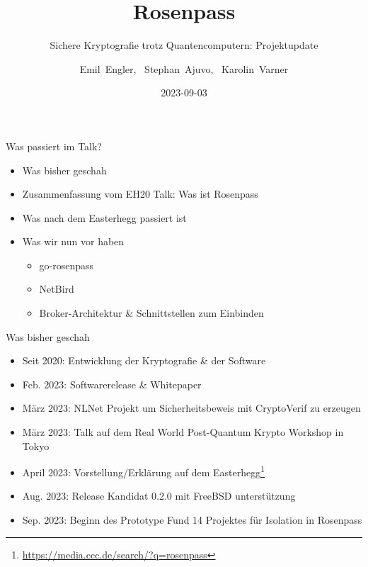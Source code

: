 \documentclass[german]{rosenpass-beamer}
\date{2023-09-03}
\title{Rosenpass}
\subtitle{
  Sichere Kryptografie trotz Quantencomputern: Projektupdate
}
\author{Emil~Engler, \ Stephan~Ajuvo, \ Karolin~Varner}
\begin{document}
\maketitle

		
\begin{frame}{Was passiert im Talk?}
\begin{itemize}
  \item Was bisher geschah
  \item Zusammenfassung vom EH20 Talk: Was ist Rosenpass
  \item Was nach dem Easterhegg passiert ist
  \item Was wir nun vor haben
    \begin{itemize}
      \item go-rosenpass
      \item NetBird
      \item Broker-Architektur \& Schnittstellen zum Einbinden
    \end{itemize}
\end{itemize}
\end{frame}

\begin{frame}{Was bisher geschah}
  \begin{itemize}
    \item Seit 2020: Entwicklung der Kryptografie \& der Software
    \item Feb. 2023: Softwarerelease \& Whitepaper
    \item März 2023: NLNet Projekt um Sicherheitsbeweis mit CryptoVerif zu erzeugen
    \item März 2023: Talk auf dem Real World Post-Quantum Krypto Workshop in Tokyo
    \item April 2023: Vorstellung/Erklärung auf dem Easterhegg\footnote{\url{https://media.ccc.de/search/?q=rosenpass}}
    \item Aug. 2023: Release Kandidat 0.2.0 mit FreeBSD unterstützung
    \item Sep. 2023: Beginn des Prototype Fund 14 Projektes für Isolation in Rosenpass
  \end{itemize}
\end{frame}
\end{document}
